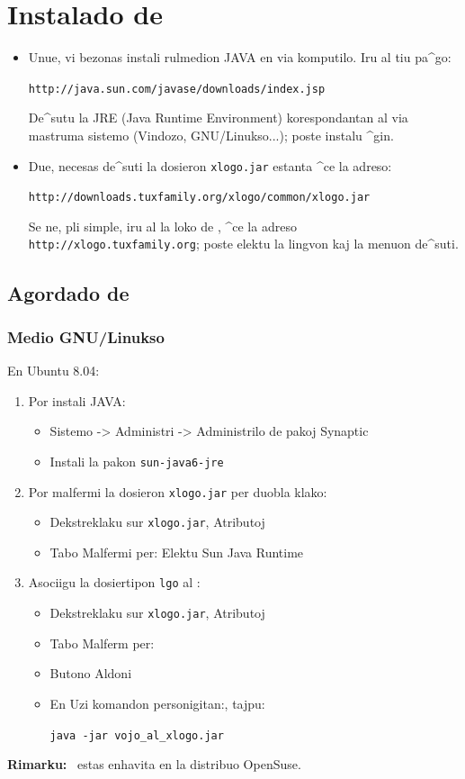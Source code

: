 \chapter{Instalado de \xlogo}
\noindent 
\begin{itemize}
 \item Unue, vi bezonas instali rulmedion JAVA en via komputilo.  Iru al tiu pa^go:
\begin{center}
 \texttt{http://java.sun.com/javase/downloads/index.jsp}
\end{center}
De^sutu la JRE (Java Runtime Environment) korespondantan al via
mastruma sistemo (Vindozo, GNU/Linukso...); poste instalu ^gin.
\item Due, necesas de^suti la dosieron \texttt{xlogo.jar} estanta ^ce
  la adreso:
\begin{center}
 \texttt{http://downloads.tuxfamily.org/xlogo/common/xlogo.jar}
\end{center}
Se ne, pli simple, iru al la loko de \xlogo, ^ce la adreso
\texttt{http://xlogo.tuxfamily.org}; poste elektu la lingvon kaj la
menuon de^suti.
\end{itemize}
\section{Agordado de \xlogo}
\subsection{Medio GNU/Linukso}
En Ubuntu 8.04:
\begin{enumerate}
 \item Por instali JAVA:
\begin{itemize}
\item Sistemo -> Administri -> Administrilo de pakoj Synaptic
\item Instali la pakon \texttt{sun-java6-jre}
\end{itemize}
\item Por malfermi la dosieron \texttt{xlogo.jar} per duobla klako:
\begin{itemize}
\item Dekstreklaku sur \texttt{xlogo.jar}, Atributoj
\item Tabo \og Malfermi per\fg: Elektu Sun Java Runtime 
\end{itemize}
 \item Asociigu la dosiertipon \texttt{lgo} al \xlogo:
\begin{itemize}
 \item Dekstreklaku sur \texttt{xlogo.jar}, Atributoj
 \item Tabo \og Malferm per\fg:
 \item Butono \og Aldoni\fg
 \item En \og Uzi komandon personigitan:\fg, tajpu:
\begin{center}
\texttt{java -jar vojo\_al\_xlogo.jar} 
\end{center}
\end{itemize}
\end{enumerate}
\textbf{Rimarku:} \xlogo\ estas enhavita en la distribuo OpenSuse.

